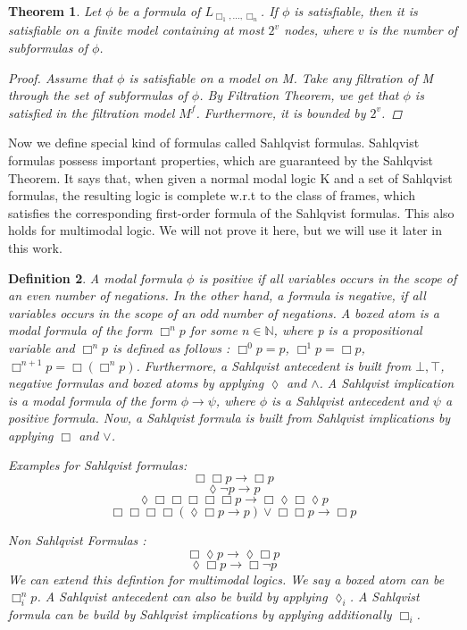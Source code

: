 \documentclass[12pt, a4paper]{scrartcl}
\newtheorem{definition}{Definition}[subsection]
\newtheorem{theorem}[definition]{Theorem}
\begin{document}
\begin{theorem}
    Let $\phi$ be a formula of $L_{\Box_1,...,\Box_n}$. If $\phi$ is satisfiable, then it is satisfiable on a finite model containing at most $2^v$ nodes, where $v$ is the number of subformulas of $\phi$.

    \begin{proof}
    Assume that $\phi$ is satisfiable on a model on M. Take any filtration of M through the set of subformulas of $\phi$. 
    By Filtration Theorem, we get that $\phi$ is satisfied in the filtration model $M^f$. Furthermore, it is bounded by $2^v$.
    
    \end{proof}
        
\end{theorem}
    Now we define special kind of formulas called Sahlqvist formulas.
    Sahlqvist formulas possess important properties, which are guaranteed by the Sahlqvist Theorem. It says that, when given a normal modal logic K and a set of Sahlqvist formulas, the resulting logic is complete w.r.t 
    to the class of frames, which satisfies the corresponding first-order formula of the Sahlqvist formulas. This also holds for multimodal logic. We will not prove it here, but we will use it later in this work.

\begin{definition}
    A modal formula $\phi$ is positive if all variables occurs in the scope of an even number of negations. In the other hand, a formula is negative, if all variables occurs in the scope of an odd number of negations.
    A boxed atom is a modal formula of the form $\Box^n p$ for some $n \in \mathbb{N}$, where p is a propositional variable and $\Box^n p$ is defined as follows :
    $\Box^0 p = p$, $\Box^1 p = \Box p$, $\Box^{n+1} p = \Box(\Box^n p)$. \newline \newline
    Furthermore, a Sahlqvist antecedent is built from $\bot, \top$, negative formulas and boxed atoms by applying $\lozenge$ and $\land$. A Sahlqvist implication is a modal formula of the form
    $\phi \rightarrow \psi$, where $\phi$ is a Sahlqvist antecedent and $\psi$ a positive formula. \newline
    Now, a Sahlqvist formula is built from Sahlqvist implications by applying $\Box$ and $\lor$. \newline
    
    Examples for Sahlqvist formulas: 
    $$\Box \Box p \rightarrow \Box p$$
    $$ \lozenge \neg p\rightarrow p$$
    $$ \lozenge \Box \Box \Box \Box \Box p\rightarrow \Box \lozenge \Box \lozenge p$$
    $$ \Box\Box\Box\Box(\lozenge \Box p\rightarrow p) \lor \Box \Box p \rightarrow \Box p $$
    
    Non Sahlqvist Formulas :
    $$\Box \lozenge p \rightarrow \lozenge \Box p$$
    $$\lozenge \Box p \rightarrow \Box \neg p$$ \newline
    We can extend this defintion for multimodal logics. We say a boxed atom can be $\Box^n_i p$. A Sahlqvist antecedent
    can also be build by applying $\lozenge_i$. A Sahlqvist formula can be build by
    Sahlqvist implications by applying additionally $\Box_i$.
\end{definition}
\end{document}
